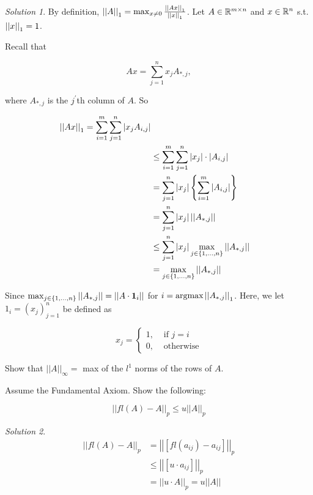 \documentclass[]{book}
\theoremstyle{definition}
\theoremstyle{definition}
\theoremstyle{definition}
\theoremstyle{remark}
\newtheorem*{solution}{Solution}
\let\BeginKnitrBlock\begin \let\EndKnitrBlock\end
\begin{document}
\begin{solution} \label{s211}
By definition, $\left \vert \left \vert A \right \vert \right \vert_1 = \max_{x\neq 0}\frac{\left \vert \left \vert Ax \right \vert \right \vert_1}{\left \vert \left \vert x \right \vert \right \vert_1}$. Let $A \in \mathbb{R}^{m\times n}$ and $x \in \mathbb{R}^n$ s.t. $\left \vert \left \vert x \right \vert \right \vert_1 = 1$. 

Recall that 

$$Ax = \sum_{j=1}^n x_j A_{*,j},$$

where $A_{*,j}$ is the $j^\prime$th column of $A$. So

\begin{align*}
  \left \vert \left \vert Ax \right \vert \right \vert_1 = \sum_{i=1}^m \sum_{j=1}^n | x_j A_{i,j} | \\
              &\leq \sum_{i=1}^m \sum_{j=1}^n | x_j | \cdot | A_{i,j} | \\
              &= \sum_{j=1}^n | x_j | \left\{\sum_{i=1}^m | A_{i,j} | \right \} \\
              &= \sum_{j=1}^n | x_j | \left \vert \left \vert A_{*,j} \right \vert \right \vert \\
              &\leq \sum_{j=1}^n | x_j | \max_{j \in \{1,\ldots, n\}} \left \vert \left \vert A_{*,j} \right \vert \right \vert \\
              &= \max_{j \in \{1,\ldots, n\}} \left \vert \left \vert A_{*,j} \right \vert \right \vert
\end{align*}

Since $\max_{j \in \{1, \ldots, n\}}\left \vert \left \vert A_{*,j} \right \vert \right \vert = \left \vert \left \vert A\cdot \mathbf{1}_i \right \vert \right \vert$ for $i = \text{argmax} \left \vert \left \vert A_{*,j} \right \vert \right \vert_1$. Here, we let $1_i = (x_j)_{j=1}^n$ be defined as 

$$x_j = \left\{ \begin{array}{rl} 1, & \text{ if } j = i \\ 0, & \text{ otherwise}\end{array} \right .$$
\end{solution}

\BeginKnitrBlock{exercise}
\protect\hypertarget{exr:q212}{}{\label{exr:q212} }Show that
\(\left|\left| A \right|\right|_\infty =\) max of the \(l^1\) norms of
the rows of \(A\).
\EndKnitrBlock{exercise}

\BeginKnitrBlock{exercise}
\protect\hypertarget{exr:q213}{}{\label{exr:q213} }Assume the Fundamental
Axiom. Show the following:

\[\left|\left| fl(A)-A \right|\right|_p \leq u \left|\left|A\right|\right|_p\]
\EndKnitrBlock{exercise}

\BeginKnitrBlock{solution}
\iffalse{} {Solution. } \fi{}

\begin{align*}
  \left | \left | fl(A) - A \right | \right |_p &= \left|\left| \left [ fl(a_{ij}) - a_{ij} \right ] \right|\right|_p \\
    &\leq \left|\left| \left[u\cdot a_{ij}\right]\right|\right|_p \\
    &= \left|\left| u\cdot A\right|\right|_p = u\left|\left|A\right|\right|
\end{align*}
\EndKnitrBlock{solution}
\end{document}
